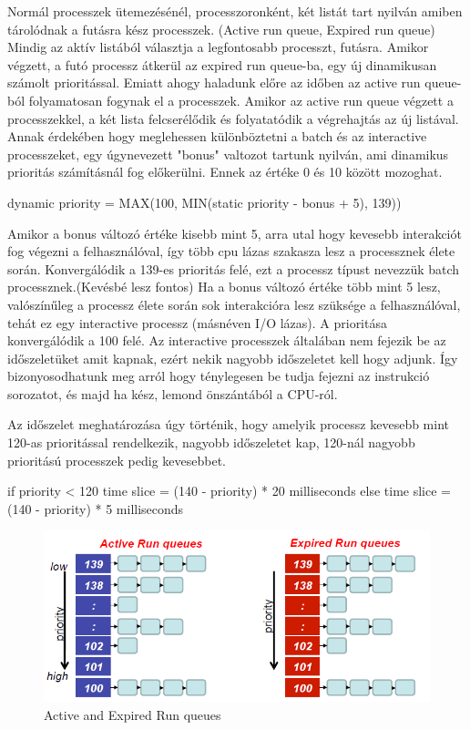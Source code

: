 Normál processzek ütemezésénél, processzoronként, két listát tart nyilván amiben tárolódnak a futásra kész processzek. (Active run queue, Expired run queue)
Mindig az aktív listából választja a legfontosabb processzt, futásra. Amikor végzett, a futó processz átkerül az expired run queue-ba, egy új dinamikusan számolt prioritással.
Emiatt ahogy haladunk előre az időben az active run queue-ból folyamatosan fogynak el a processzek.  Amikor az active run queue végzett a processzekkel, a két lista felcserélődik és folyatatódik a végrehajtás az új listával.
Annak érdekében hogy meglehessen különböztetni a batch és az interactive processzeket, egy úgynevezett "bonus" valtozot tartunk nyilván, ami dinamikus prioritás számításnál fog előkerülni. Ennek az értéke 0 és 10 között mozoghat.
\begin{cpp}
dynamic priority = MAX(100, MIN(static priority - bonus + 5), 139)) 
\end{cpp}
Amikor a bonus változó értéke kisebb mint 5, arra utal hogy kevesebb interakciót fog végezni a felhasználóval, így több cpu lázas szakasza lesz a processznek élete során. Konvergálódik a 139-es prioritás felé, ezt a processz típust nevezzük batch processznek.(Kevésbé lesz fontos) 
Ha a bonus változó értéke több mint 5 lesz, valószínűleg a processz élete során sok interakcióra lesz szüksége a felhasználóval, tehát ez egy interactive processz (másnéven I/O lázas). A prioritása konvergálódik a 100 felé. Az interactive processzek általában nem fejezik be az időszeletüket amit kapnak, ezért nekik nagyobb időszeletet kell hogy adjunk. Így bizonyosodhatunk meg arról hogy ténylegesen be tudja fejezni az instrukció sorozatot, és majd ha kész, lemond önszántából a CPU-ról.

Az időszelet meghatározása úgy történik, hogy amelyik processz kevesebb mint 120-as prioritással rendelkezik, nagyobb időszeletet kap, 120-nál nagyobb prioritású processzek pedig kevesebbet.
\begin{cpp}
if priority < 120 
	time slice = (140 - priority) * 20    milliseconds 
else
	time slice = (140 - priority) * 5   milliseconds 
\end{cpp}

\begin{figure}[h]
\centering
\includegraphics[width=\textwidth]{images/activeexpiredrunqueue.png}
\caption{Active and Expired Run queues}
\label{fig:Active and expired runqueues}
\end{figure}

